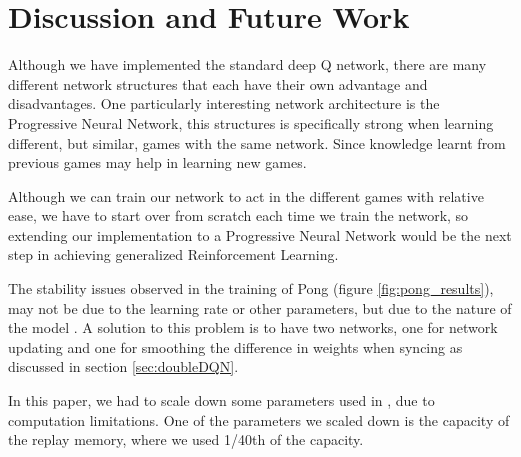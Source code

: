 \documentclass{article}
\begin{document}
\section{Discussion and Future Work}
Although we have implemented the standard deep Q network, there are many different network structures that each have their own advantage and disadvantages. One particularly interesting network architecture is the Progressive Neural Network, this structures is specifically strong when learning different, but similar, games with the same network. Since knowledge learnt from previous games may help in learning new games.

Although we can train our network to act in the different games with relative ease, we have to start over from scratch each time we train the network, so extending our implementation to a Progressive Neural Network would be the next step in achieving generalized Reinforcement Learning.

The stability issues observed in the training of Pong (figure \ref{fig:pong_results}), may not be due to the learning rate or other parameters, but due to the nature of the model \cite{van2016deep}. A solution to this problem is to have two networks, one for network updating and one for smoothing the difference in weights when syncing as discussed in section \ref{sec:doubleDQN}.

In this paper, we had to scale down some parameters used in \cite{mnih2015human}, due to computation limitations. One of the parameters we scaled down is the capacity of the replay memory, where we used 1/40th of the capacity.




\end{document}
